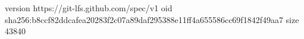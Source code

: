 version https://git-lfs.github.com/spec/v1
oid sha256:b8ccf82ddcafea20283f2c07a89daf295388e11ff4a655586cc69f1842f49aa7
size 43840
